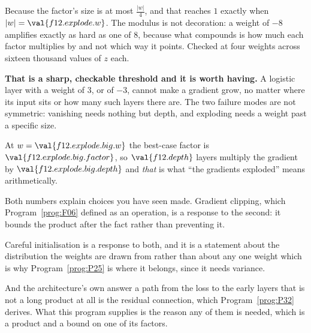 \begin{fr}
Because the factor's size is at most $\frac{\lvert w \rvert}{4}$, and that
reaches $1$ exactly when $\lvert w \rvert = \val{f12.explode.w}$. The modulus
is not decoration: a weight of $-8$ amplifies exactly as hard as one of $8$,
because what compounds is how much each factor multiplies by and not which way
it points. Checked at four weights across sixteen thousand values of $z$ each.

\textbf{That is a sharp, checkable threshold and it is worth having.} A
logistic layer with a weight of $3$, or of $-3$, cannot make a gradient grow,
no matter where its input sits or how many such layers there are. The two
failure modes are not symmetric: vanishing needs nothing but depth, and
exploding needs a weight past a specific size.

At $w = \val{f12.explode.big.w}$ the best-case factor is
$\val{f12.explode.big.factor}$, so $\val{f12.depth}$ layers multiply the
gradient by $\val{f12.explode.big.depth}$ \dash{} and \emph{that} is what
\enquote{the gradients exploded} means arithmetically.

\begin{aibox}
Both numbers explain choices you have seen made. Gradient clipping, which
Program~\ref{prog:F06} defined as an operation, is a response to the second:
it bounds the product after the fact rather than preventing it.

Careful initialisation is a response to both, and it is a statement about the
distribution the weights are drawn from rather than about any one weight
\dash{} which is why Program~\ref{prog:P25} is where it belongs, since it
needs variance.

And the architecture's own answer \dash{} a path from the loss to the early
layers that is not a long product at all \dash{} is the residual connection,
which Program~\ref{prog:P32} derives. What this program supplies is the reason
any of them is needed, which is a product and a bound on one of its factors.
\end{aibox}
\end{fr}

